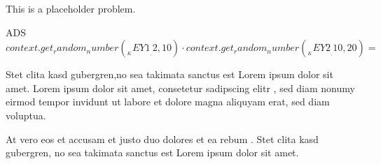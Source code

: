 This is a placeholder problem.
\begin{Problem}
\item ADS ${{context.get_random_number(__KEY1__, 2, 10)}} \cdot {{context.get_random_number(__KEY2__, 10, 20)}} = $ 
\item Stet clita kasd gubergren,no sea takimata sanctus est Lorem ipsum dolor sit amet. Lorem ipsum dolor sit amet, consetetur sadipscing elitr , sed diam nonumy eirmod tempor invidunt ut labore et dolore magna aliquyam erat, sed diam voluptua. 
\item At vero eos et accusam et justo duo dolores et ea rebum . Stet clita kasd gubergren, no sea takimata sanctus est Lorem ipsum dolor sit amet. 
\end{Problem}
